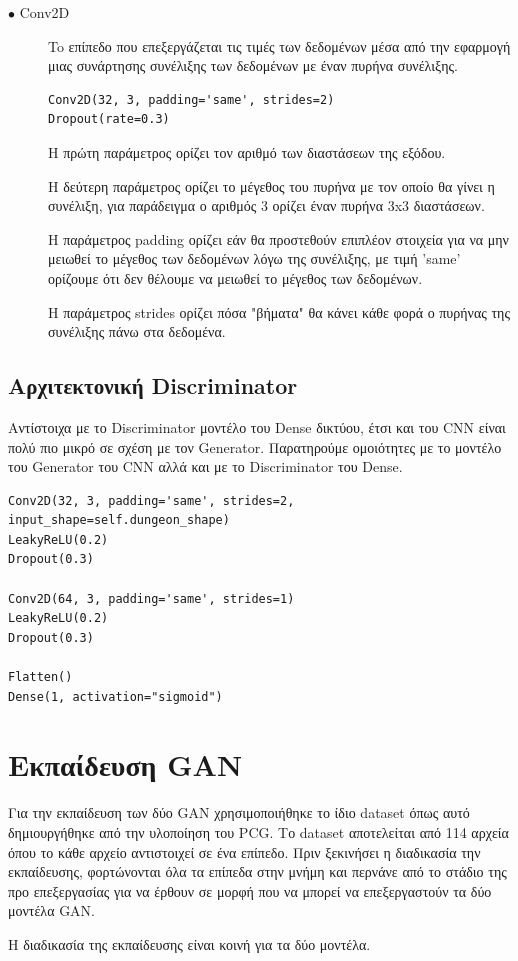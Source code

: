 \begin{description}
\item[$\bullet$ Conv2D] To επίπεδο που επεξεργάζεται τις τιμές των δεδομένων μέσα από την εφαρμογή μιας συνάρτησης συνέλιξης των δεδομένων με έναν πυρήνα συνέλιξης. \cite{conv2d}
\par
\begin{verbatim}
Conv2D(32, 3, padding='same', strides=2)
Dropout(rate=0.3)
\end{verbatim}
\par
Η πρώτη παράμετρος ορίζει τον αριθμό των διαστάσεων της εξόδου.
\par
Η δεύτερη παράμετρος ορίζει το μέγεθος του πυρήνα με τον οποίο θα γίνει η συνέλιξη, για παράδειγμα ο αριθμός 3 ορίζει έναν πυρήνα 3x3 διαστάσεων.
\par
H παράμετρος padding ορίζει εάν θα προστεθούν επιπλέον στοιχεία για να μην μειωθεί το μέγεθος των δεδομένων λόγω της συνέλιξης, με τιμή 'same' ορίζουμε ότι δεν θέλουμε να μειωθεί το μέγεθος των δεδομένων.
\par
H παράμετρος strides ορίζει πόσα "βήματα" θα κάνει κάθε φορά ο πυρήνας της συνέλιξης πάνω στα δεδομένα.
\end{description}


\subsection{Αρχιτεκτονική Discriminator}
Αντίστοιχα με το Discriminator μοντέλο του Dense δικτύου, έτσι και του CNN είναι πολύ πιο μικρό σε σχέση με τον Generator. Παρατηρούμε ομοιότητες με το μοντέλο του Generator του CNN αλλά και με το Discriminator του Dense.

\begin{verbatim}
Conv2D(32, 3, padding='same', strides=2, input_shape=self.dungeon_shape)
LeakyReLU(0.2)
Dropout(0.3)

Conv2D(64, 3, padding='same', strides=1)
LeakyReLU(0.2)
Dropout(0.3)

Flatten()
Dense(1, activation="sigmoid")

\end{verbatim}


\section{Εκπαίδευση GAN}
Για την εκπαίδευση των δύο GAN χρησιμοποιήθηκε το ίδιο dataset όπως αυτό δημιουργήθηκε από την υλοποίηση του PCG. Το dataset αποτελείται από 114 αρχεία όπου το κάθε αρχείο αντιστοιχεί σε ένα επίπεδο. Πριν ξεκινήσει η διαδικασία την εκπαίδευσης, φορτώνονται όλα τα επίπεδα στην μνήμη και περνάνε από το στάδιο της προ επεξεργασίας για να έρθουν σε μορφή που να μπορεί να επεξεργαστούν τα δύο μοντέλα GAN.
\par
Η διαδικασία της εκπαίδευσης είναι κοινή για τα δύο μοντέλα.

